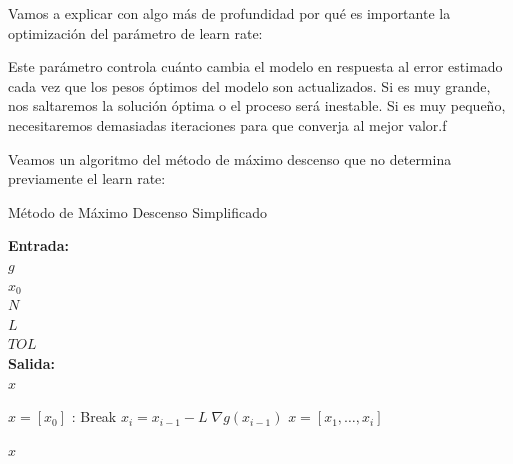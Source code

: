 Vamos a explicar con algo más de profundidad por qué es importante la optimización del parámetro de learn rate:

Este parámetro controla cuánto cambia el modelo en respuesta al error estimado cada vez que los pesos óptimos del modelo son actualizados.
Si es muy grande, nos saltaremos la solución óptima o el proceso será inestable. Si es muy pequeño, necesitaremos demasiadas iteraciones para que converja al mejor valor.f

Veamos un algoritmo del método de máximo descenso que no determina previamente el learn rate:

\begin{algorithm}[H]
	\caption{Método de Máximo Descenso Simplificado}
	\hspace*{\algorithmicindent}\textbf{Entrada: } \\
	\hspace*{\algorithmicindent*2} $g$  \\
	\hspace*{\algorithmicindent*2} $x_0$  \\
	\hspace*{\algorithmicindent*2} $N$  \\
	\hspace*{\algorithmicindent*2} $L$  \\
	\hspace*{\algorithmicindent} $TOL$  \\
	\hspace*{\algorithmicindent}\textbf{Salida:} \\
	\hspace*{\algorithmicindent*2} $x$ 
	\begin{algorithmic}
		\Procedure {}{}
		\State $x = [x_0]$ 
			:
				\State Break 
			\EndIf
			\State $x_i = x_{i-1} - L \; \nabla g(x_{i-1})$
			\State $x = [x_1, \dots , x_i]$
			
		\EndFor
		\State \Return $x$ 
		\EndProcedure
	\end{algorithmic}
\end{algorithm}

